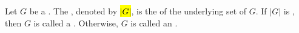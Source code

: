 \begin{definition} \label{definition:order_of_a_group}
Let $G$ be a . The , denoted by \hl{$|G|$}, is the  of the underlying set of $G$. If $|G|$ is , then $G$ is called a . Otherwise, $G$ is called an .
\end{definition}